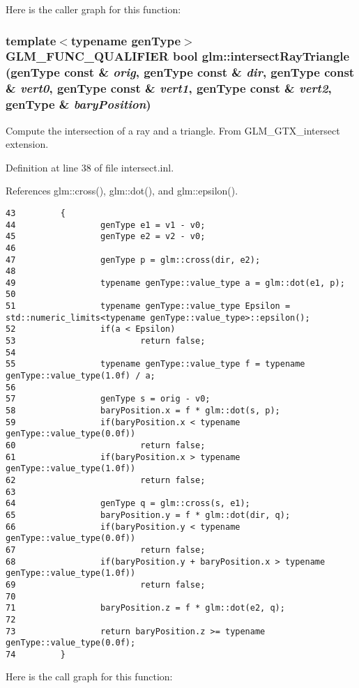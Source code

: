 Here is the caller graph for this function:\hypertarget{group__gtx__intersect_gbf48f0fca6a10a8edb001b3d546de5fe}{
\subsubsection[intersectRayTriangle]{\setlength{\rightskip}{0pt plus 5cm}template$<$typename genType$>$ GLM\_\-FUNC\_\-QUALIFIER bool glm::intersectRayTriangle (genType const \& {\em orig}, \/  genType const \& {\em dir}, \/  genType const \& {\em vert0}, \/  genType const \& {\em vert1}, \/  genType const \& {\em vert2}, \/  genType \& {\em baryPosition})}}
\label{group__gtx__intersect_gbf48f0fca6a10a8edb001b3d546de5fe}


Compute the intersection of a ray and a triangle. From GLM\_\-GTX\_\-intersect extension. 

Definition at line 38 of file intersect.inl.

References glm::cross(), glm::dot(), and glm::epsilon().

\begin{Code}\begin{verbatim}43         {
44                 genType e1 = v1 - v0;
45                 genType e2 = v2 - v0;
46 
47                 genType p = glm::cross(dir, e2);
48 
49                 typename genType::value_type a = glm::dot(e1, p);
50 
51                 typename genType::value_type Epsilon = std::numeric_limits<typename genType::value_type>::epsilon();
52                 if(a < Epsilon)
53                         return false;
54 
55                 typename genType::value_type f = typename genType::value_type(1.0f) / a;
56 
57                 genType s = orig - v0;
58                 baryPosition.x = f * glm::dot(s, p);
59                 if(baryPosition.x < typename genType::value_type(0.0f))
60                         return false;
61                 if(baryPosition.x > typename genType::value_type(1.0f))
62                         return false;
63 
64                 genType q = glm::cross(s, e1);
65                 baryPosition.y = f * glm::dot(dir, q);
66                 if(baryPosition.y < typename genType::value_type(0.0f))
67                         return false;
68                 if(baryPosition.y + baryPosition.x > typename genType::value_type(1.0f))
69                         return false;
70 
71                 baryPosition.z = f * glm::dot(e2, q);
72 
73                 return baryPosition.z >= typename genType::value_type(0.0f);
74         }
\end{verbatim}
\end{Code}




Here is the call graph for this function: